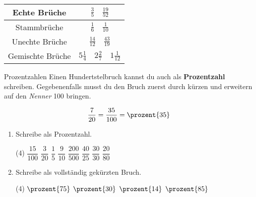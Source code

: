 \documentclass[12pt,a5paper,landscape]{scrartcl}
\begin{document}
	\begin{loesungskarte}
		\begin{center}
			\begin{tabular}{|c|c|}\hline
				Echte Brüche & $\tfrac{3}{5}\quad \tfrac{19}{52}$ \\\hline
				Stammbrüche & $\tfrac{1}{6}\quad \tfrac{1}{10}$ \\\hline
				Unechte Brüche & $\tfrac{14}{12}\quad \tfrac{43}{19}$ \\\hline
				Gemischte Brüche & $5\tfrac{1}{4}\quad 2\tfrac{2}{7}\quad 1\tfrac{1}{12}$ \\\hline
			\end{tabular}
		\end{center}
	\end{loesungskarte}
	
	\begin{karte1}{Prozentzahlen}
		Einen Hundertstelbruch kannst du auch als \textbf{Prozentzahl} schreiben. Gegebenenfalls musst du den Bruch zuerst durch kürzen und erweitern auf den \emph{Nenner} \num{100} bringen.
		
		\[ \frac{7}{20} = \frac{35}{100} = \prozent{35} \]
		
		\begin{enumerate}
			\item Schreibe als Prozentzahl.
			\begin{tasks}(4)
				\task $\dfrac{15}{100}$
				\task $\dfrac{3}{20}$
				\task $\dfrac{1}{5}$
				\task $\dfrac{9}{10}$
				\task $\dfrac{200}{500}$
				\task $\dfrac{40}{25}$
				\task $\dfrac{30}{30}$
				\task $\dfrac{20}{80}$
			\end{tasks}
			
			\item Schreibe als vollständig gekürzten Bruch.
			\begin{tasks}(4)
				\task $\prozent{75}$
				\task $\prozent{30}$
				\task $\prozent{14}$
				\task $\prozent{85}$
			\end{tasks}
		\end{enumerate}
	\end{karte1}
	
\end{document}
